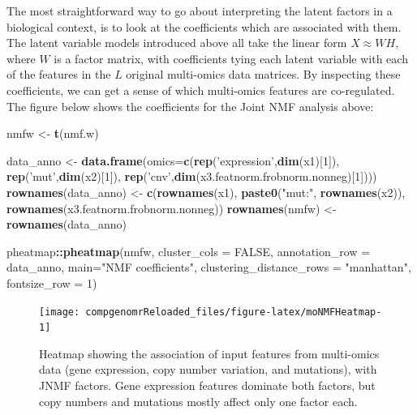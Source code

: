 \documentclass[12pt,]{krantz}
\newenvironment{Shaded}{\begin{snugshade}}{\end{snugshade}}
\newcommand{\DataTypeTok}[1]{\textcolor[rgb]{0.13,0.29,0.53}{#1}}
\newcommand{\DecValTok}[1]{\textcolor[rgb]{0.00,0.00,0.81}{#1}}
\newcommand{\KeywordTok}[1]{\textcolor[rgb]{0.13,0.29,0.53}{\textbf{#1}}}
\newcommand{\NormalTok}[1]{#1}
\newcommand{\OperatorTok}[1]{\textcolor[rgb]{0.81,0.36,0.00}{\textbf{#1}}}
\newcommand{\OtherTok}[1]{\textcolor[rgb]{0.56,0.35,0.01}{#1}}
\newcommand{\StringTok}[1]{\textcolor[rgb]{0.31,0.60,0.02}{#1}}
\begin{document}
The most straightforward way to go about interpreting the latent factors in a biological context, is to look at the coefficients which are associated with them. The latent variable models introduced above all take the linear form \(X \approx WH\), where \(W\) is a factor matrix, with coefficients tying each latent variable with each of the features in the \(L\) original multi-omics data matrices. By inspecting these coefficients, we can get a sense of which multi-omics features are co-regulated. The figure below shows the coefficients for the Joint NMF analysis above:

\begin{Shaded}
\begin{Highlighting}[]
\NormalTok{nmfw <-}\StringTok{ }\KeywordTok{t}\NormalTok{(nmf.w)}

\NormalTok{data_anno <-}\StringTok{ }\KeywordTok{data.frame}\NormalTok{(}\DataTypeTok{omics=}\KeywordTok{c}\NormalTok{(}\KeywordTok{rep}\NormalTok{(}\StringTok{'expression'}\NormalTok{,}\KeywordTok{dim}\NormalTok{(x1)[}\DecValTok{1}\NormalTok{]), }\KeywordTok{rep}\NormalTok{(}\StringTok{'mut'}\NormalTok{,}\KeywordTok{dim}\NormalTok{(x2)[}\DecValTok{1}\NormalTok{]), }\KeywordTok{rep}\NormalTok{(}\StringTok{'cnv'}\NormalTok{,}\KeywordTok{dim}\NormalTok{(x3.featnorm.frobnorm.nonneg)[}\DecValTok{1}\NormalTok{])))}
\KeywordTok{rownames}\NormalTok{(data_anno) <-}\StringTok{ }\KeywordTok{c}\NormalTok{(}\KeywordTok{rownames}\NormalTok{(x1), }\KeywordTok{paste0}\NormalTok{(}\StringTok{"mut:"}\NormalTok{, }\KeywordTok{rownames}\NormalTok{(x2)), }\KeywordTok{rownames}\NormalTok{(x3.featnorm.frobnorm.nonneg))}
\KeywordTok{rownames}\NormalTok{(nmfw) <-}\StringTok{ }\KeywordTok{rownames}\NormalTok{(data_anno)}

\NormalTok{pheatmap}\OperatorTok{::}\KeywordTok{pheatmap}\NormalTok{(nmfw,}
                   \DataTypeTok{cluster_cols =} \OtherTok{FALSE}\NormalTok{,}
                   \DataTypeTok{annotation_row =}\NormalTok{ data_anno,}
                   \DataTypeTok{main=}\StringTok{"NMF coefficients"}\NormalTok{,}
                   \DataTypeTok{clustering_distance_rows =} \StringTok{"manhattan"}\NormalTok{,}
                   \DataTypeTok{fontsize_row =} \DecValTok{1}\NormalTok{)}
\end{Highlighting}
\end{Shaded}

\begin{figure}

{\centering \texttt{[image: compgenomrReloaded\_files/figure-latex/moNMFHeatmap-1]} 

}

\caption{Heatmap showing the association of input features from multi-omics data (gene expression, copy number variation, and mutations), with JNMF factors. Gene expression features dominate both factors, but copy numbers and mutations mostly affect only one factor each.}\label{fig:moNMFHeatmap}
\end{figure}
\end{document}
